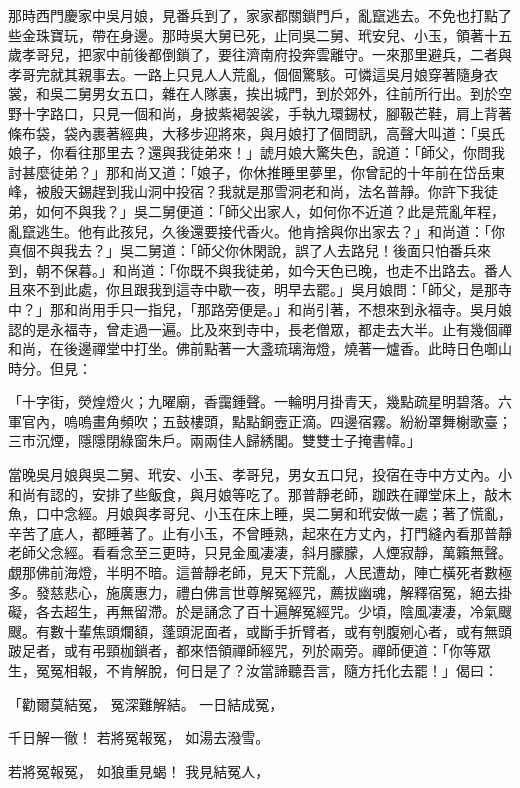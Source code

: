 \begin{showcontents}{}
那時西門慶家中吳月娘，見番兵到了，家家都關鎖門戶，亂竄逃去。不免也打點了些金珠寶玩，帶在身邊。那時吳大舅已死，止同吳二舅、玳安兒、小玉，領著十五歲孝哥兒，把家中前後都倒鎖了，要往濟南府投奔雲離守。一來那里避兵，二者與孝哥完就其親事去。一路上只見人人荒亂，個個驚駭。可憐這吳月娘穿著隨身衣裳，和吳二舅男女五口，雜在人隊裏，挨出城門，到於郊外，往前所行出。到於空野十字路口，只見一個和尚，身披紫褐袈裟，手執九環錫杖，腳靸芒鞋，肩上背著條布袋，袋內裹著經典，大移步迎將來，與月娘打了個問訊，高聲大叫道：「吳氏娘子，你看往那里去？還與我徒弟來！」諕月娘大驚失色，說道：「師父，你問我討甚麼徒弟？」那和尚又道：「娘子，你休推睡里夢里，你曾記的十年前在岱岳東峰，被殷天錫趕到我山洞中投宿？我就是那雪洞老和尚，法名普靜。你許下我徒弟，如何不與我？」吳二舅便道：「師父出家人，如何你不近道？此是荒亂年程，亂竄逃生。他有此孩兒，久後還要接代香火。他肯捨與你出家去？」和尚道：「你真個不與我去？」吳二舅道：「師父你休閑說，誤了人去路兒！後面只怕番兵來到，朝不保暮。」和尚道：「你既不與我徒弟，如今天色已晚，也走不出路去。番人且來不到此處，你且跟我到這寺中歇一夜，明早去罷。」吳月娘問：「師父，是那寺中？」那和尚用手只一指兒，「那路旁便是。」和尚引著，不想來到永福寺。吳月娘認的是永福寺，曾走過一遍。比及來到寺中，長老僧眾，都走去大半。止有幾個禪和尚，在後邊禪堂中打坐。佛前點著一大盞琉璃海燈，燒著一爐香。此時日色啣山時分。但見：

「十字街，熒煌燈火；九曜廟，香靄鍾聲。一輪明月掛青天，幾點疏星明碧落。六軍官內，嗚嗚畫角頻吹；五鼓樓頭，點點銅壼正滴。四邊宿霧。紛紛罩舞榭歌臺；三巿沉煙，隱隱閉綠窗朱戶。兩兩佳人歸綉閣。雙雙士子掩書幃。」

當晚吳月娘與吳二舅、玳安、小玉、孝哥兒，男女五口兒，投宿在寺中方丈內。小和尚有認的，安排了些飯食，與月娘等吃了。那普靜老師，跏跌在禪堂床上，敲木魚，口中念經。月娘與孝哥兒、小玉在床上睡，吳二舅和玳安做一處；著了慌亂，辛苦了底人，都睡著了。止有小玉，不曾睡熟，起來在方丈內，打門縫內看那普靜老師父念經。看看念至三更時，只見金風凄凄，斜月朦朦，人煙寂靜，萬籟無聲。覷那佛前海燈，半明不暗。這普靜老師，見天下荒亂，人民遭劫，陣亡橫死者數極多。發慈悲心，施廣惠力，禮白佛言世尊解冤經咒，薦拔幽魂，解釋宿冤，絕去掛礙，各去超生，再無留滯。於是誦念了百十遍解冤經咒。少頃，陰風凄凄，冷氣颼颼。有數十輩焦頭爛額，蓬頭泥面者，或斷手折臂者，或有刳腹剜心者，或有無頭跛足者，或有弔頸枷鎖者，都來悟領禪師經咒，列於兩旁。禪師便道：「你等眾生，冤冤相報，不肯解脫，何日是了？汝當諦聽吾言，隨方托化去罷！」偈曰：

「勸爾莫結冤，  冤深難解結。  一日結成冤，

千日解一徹！  若將冤報冤，  如湯去潑雪。

若將冤報冤，  如狼重見蝎！  我見結冤人，


\end{showcontents}
